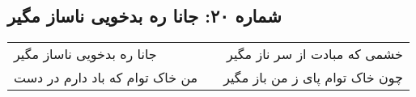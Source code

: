 \begin{center}
\section*{شماره ۲۰: جانا ره بدخویی ناساز مگیر}
\label{sec:020}
\begin{longtable}{l p{0.5cm} r}
جانا ره بدخویی ناساز مگیر
&&
خشمی که مبادت از سر ناز مگیر
\\
من خاک توام که باد دارم در دست
&&
چون خاک توام پای ز من باز مگیر
\\
\end{longtable}
\end{center}
